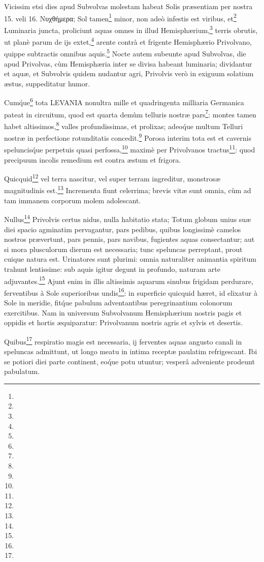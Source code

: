 \documentclass[a4paper, 11pt, oneside, polutonikogreek, german]{article}
\begin{document}
Vicissim etsi dies apud Subvolvas molestam habeat Solis præsentiam per nostra 15. veli 16. Νυχθήμερα; Sol tamen\footnote{} minor, non adeò infestis est viribus, et\footnote{} Luminaria juncta, proliciunt aquas omnes in illud Hemisphærium,\footnote{} terris obrutis, ut planè parum de ijs extet,\footnote{} arente contrà et frigente Hemisphærio Privolvano, quippe subtractis omnibus aquis.\footnote{} Nocte autem subeunte apud Subvolvas, die apud Privolvas, cùm Hemisphæria inter se divisa habeant luminaria; dividantur et aquæ, et Subvolvis quidem nudantur agri, Privolvis verò in exiguum solatium æstus, suppeditatur humor.

Cum\'que\footnote{} tota LEVANIA nonultra mille et quadringenta milliaria Germanica pateat in circuitum, quod est quarta demùm telluris nostræ pars\footnote{}: montes tamen habet altissimos,\footnote{} valles profundissimas, et prolixas; adeo\'que multum Telluri nostræ in perfectione rotunditatis concedit.\footnote{} Porosa interim tota est et cavernis speluncis\'que perpetuis quasi perfossa,\footnote{} maximè per Privolvanos tractus\footnote{}: quod precipuum incolis remedium est contra æstum et frigora.

Quicquid\footnote{} vel terra nascitur, vel super terram ingreditur, monstrosæ magnitudinis est.\footnote{} Incrementa fiunt celerrima; brevis vitæ sunt omnia, cùm ad tam immanem corporum molem adolescant.

Nullus\footnote{} Privolvis certus nidus, nulla habitatio stata; Totum globum unius suæ diei spacio agminatim pervagantur, pars pedibus, quibus longissimè camelos nostros prævertunt, pars pennis, pars navibus, fugientes aquas consectantur; aut si mora plusculorum dierum est necessaria; tunc speluncas perreptant, prout cuique natura est. Urinatores sunt plurimi: omnia naturaliter animantia spiritum trahunt lentissime: sub aquis igitur degunt in profundo, naturam arte adjuvantes.\footnote{} Ajunt enim in illis altissimis aquarum sinubus frigidam perdurare, ferventibus à Sole superioribus undis\footnote{}: in superficie quicquid hæret, id elixatur à Sole in meridie, fit\'que pabulum adventantibus peregrinantium colonorum exercitibus. Nam in universum Subvolvanum Hemisphærium nostris pagis et oppidis et hortis æquiparatur: Privolvanum nostris agris et sylvis et desertis.

Quibus\footnote{} respiratio magis est necessaria, ij ferventes aquas angusto canali in speluncas admittunt, ut longo meatu in intima receptæ paulatim refrigescant. Ibi se potiori diei parte continent, eo\'que potu utuntur; vesperâ adveniente prodeunt pabulatum.
\end{document}

